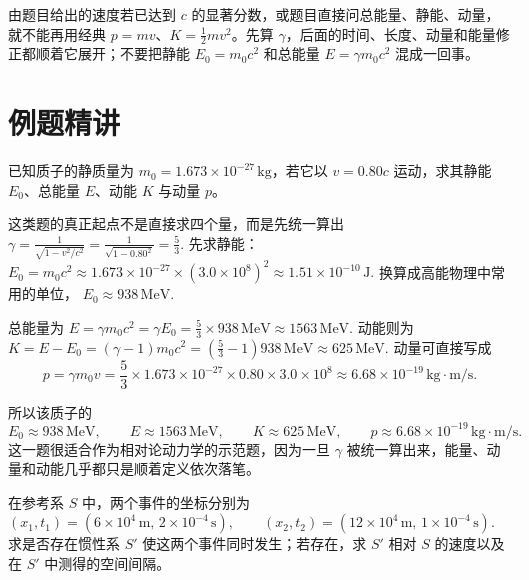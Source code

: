 \documentclass[lang=cn,11pt]{elegantbook}
\begin{document}
\begin{note}
 由题目给出的速度若已达到 \(c\) 的显著分数，或题目直接问总能量、静能、动量，就不能再用经典 \(p=mv\)、\(K=\frac12 mv^2\)。先算 \(\gamma\)，后面的时间、长度、动量和能量修正都顺着它展开；不要把静能 \(E_0=m_0c^2\) 和总能量 \(E=\gamma m_0c^2\) 混成一回事。
\end{note}

\section{例题精讲}

\begin{exercise}
已知质子的静质量为 \(m_0=1.673\times 10^{-27}\,\mathrm{kg}\)，若它以 \(v=0.80c\) 运动，求其静能 \(E_0\)、总能量 \(E\)、动能 \(K\) 与动量 \(p\)。
\end{exercise}

\begin{solution}
这类题的真正起点不是直接求四个量，而是先统一算出
 \(\gamma=\frac{1}{\sqrt{1-v^2/c^2}} =\frac{1}{\sqrt{1-0.80^2}} =\frac{5}{3}.\) 
先求静能：
 \(E_0=m_0c^2 \approx 1.673\times 10^{-27}\times (3.0\times 10^8)^2 \approx 1.51\times 10^{-10}\,\mathrm{J}.\) 
换算成高能物理中常用的单位，
 \(E_0\approx 938\,\mathrm{MeV}.\) 

总能量为
 \(E=\gamma m_0c^2=\gamma E_0 =\frac53\times 938\,\mathrm{MeV} \approx 1563\,\mathrm{MeV}.\) 
动能则为
 \(K=E-E_0=(\gamma-1)m_0c^2 =\left(\frac53-1\right)938\,\mathrm{MeV} \approx 625\,\mathrm{MeV}.\) 
动量可直接写成
\[
p=\gamma m_0v
=\frac53\times 1.673\times 10^{-27}\times 0.80\times 3.0\times 10^8
\approx 6.68\times 10^{-19}\,\mathrm{kg\cdot m/s}.
\]

所以该质子的
\[
\boxed{E_0\approx 938\,\mathrm{MeV},\qquad E\approx 1563\,\mathrm{MeV},\qquad K\approx 625\,\mathrm{MeV},\qquad p\approx 6.68\times 10^{-19}\,\mathrm{kg\cdot m/s}.}
\]
这一题很适合作为相对论动力学的示范题，因为一旦 \(\gamma\) 被统一算出来，能量、动量和动能几乎都只是顺着定义依次落笔。
\end{solution}

\begin{exercise}[另一参考系中两事件为何会同时发生]
在参考系 \(S\) 中，两个事件的坐标分别为
 \((x_1,t_1)=(6\times 10^4\,\mathrm{m},\,2\times 10^{-4}\,\mathrm{s}), \qquad (x_2,t_2)=(12\times 10^4\,\mathrm{m},\,1\times 10^{-4}\,\mathrm{s}).\) 
求是否存在惯性系 \(S'\) 使这两个事件同时发生；若存在，求 \(S'\) 相对 \(S\) 的速度以及在 \(S'\) 中测得的空间间隔。
\end{exercise}
\end{document}
